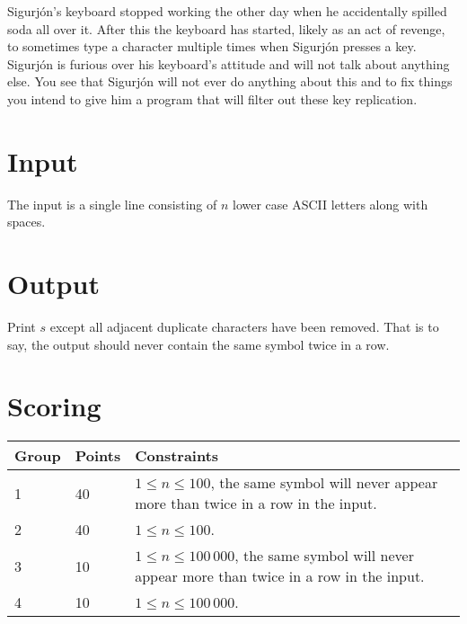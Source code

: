 
Sigurjón's keyboard stopped working the other day when he accidentally spilled soda all over it.
After this the keyboard has started, likely as an act of revenge,
to sometimes type a character multiple times when Sigurjón presses a key.
Sigurjón is furious over his keyboard's attitude and will not talk about anything else.
You see that Sigurjón will not ever do anything about this and to fix things you intend
to give him a program that will filter out these key replication.

\section*{Input}
The input is a single line consisting of $n$ lower case ASCII letters along with spaces.

\section*{Output}
Print $s$ except all adjacent duplicate characters have been removed.
That is to say, the output should never contain the same symbol twice in a row.

\section*{Scoring}
\begin{tabular}{|l|l|l|}
\hline
Group & Points & Constraints \\ \hline
1     & 40   & $1 \leq n \leq 100$, the same symbol will never appear more than twice in a row in the input. \\ \hline
2     & 40   & $1 \leq n \leq 100$. \\ \hline
3     & 10   & $1 \leq n \leq 100\,000$, the same symbol will never appear more than twice in a row in the input. \\ \hline
4     & 10   & $1 \leq n \leq 100\,000$. \\ \hline
\end{tabular}
